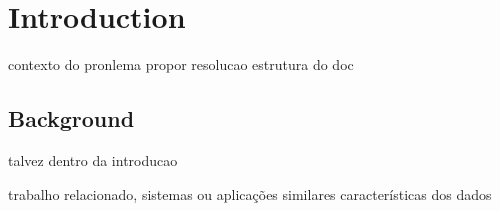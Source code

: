 \section{Introduction}
contexto do pronlema
propor resolucao
estrutura do doc

\subsection*{Background}
talvez dentro da introducao

trabalho relacionado, sistemas ou aplicações similares
características dos dados